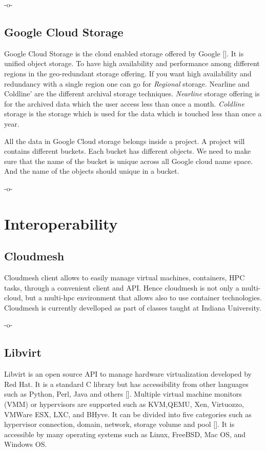      -o-

\subsection{Google Cloud Storage}

Google Cloud Storage is the cloud enabled storage offered by
Google [\cite{www-google-cloud-storage}]. It is unified object
storage. To have high availability and performance among different
regions in the geo-redundant storage offering. If you want high
availability and redundancy with a single region one can go for
\textit{Regional} storage. Nearline and Coldline' are the different
archival storage techniques. \textit{Nearline} storage offering is for
the archived data which the user access less than once a
month. \textit{Coldline} storage is the storage which is used for the
data which is touched less than once a year.

All the data in Google Cloud storage belongs inside a project. A
project will contains different buckets. Each bucket has different
objects. We need to make sure that the name of the bucket is unique
across all Google cloud name space. And the name of the objects should
unique in a bucket.

     -o-


\section{Interoperability}
\label{S:o-interoperability}


\subsection{Cloudmesh}

Cloudmesh client allows to easily manage virtual machines, containers,
HPC tasks, through a convenient client and API. Hence cloudmesh is not
only a multi-cloud, but a multi-hpc environment that allows also to
use container technologies. Cloudmesh is currently develloped as part
of classes taught at Indiana University.

-o-

\subsection{Libvirt}

Libvirt is an open source API to manage hardware virtualization
developed by Red Hat.  It is a standard C library but has
accessibility from other languages such as Python, Perl, Java and
others [\cite{www-libvirt}]. Multiple virtual machine monitors (VMM) or
hypervisors are supported such as KVM,QEMU, Xen, Virtuozzo, VMWare
ESX, LXC, and BHyve.  It can be divided into five categories such as
hypervisor connection, domain, network, storage volume and
pool [\cite{www-ibm}]. It is accessible by many operating systems such
as Linux, FreeBSD, Mac OS, and Windows OS.

